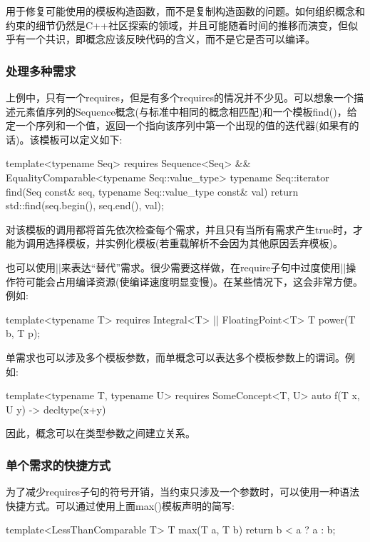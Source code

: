 用于修复可能使用的模板构造函数，而不是复制构造函数的问题。如何组织概念和约束的细节仍然是C++社区探索的领域，并且可能随着时间的推移而演变，但似乎有一个共识，即概念应该反映代码的含义，而不是它是否可以编译。

\subsubsection{处理多种需求}

上例中，只有一个requires，但是有多个requires的情况并不少见。可以想象一个描述元素值序列的Sequence概念(与标准中相同的概念相匹配)和一个模板find()，给定一个序列和一个值，返回一个指向该序列中第一个出现的值的迭代器(如果有的话)。该模板可以定义如下:

\begin{cpp}
template<typename Seq>
	requires Sequence<Seq> &&
			EqualityComparable<typename Seq::value_type>
	typename Seq::iterator find(Seq const& seq,
								typename Seq::value_type const& val)
{
	return std::find(seq.begin(), seq.end(), val);
}
\end{cpp}

对该模板的调用都将首先依次检查每个需求，并且只有当所有需求产生true时，才能为调用选择模板，并实例化模板(若重载解析不会因为其他原因丢弃模板)。

也可以使用||来表达“替代”需求。很少需要这样做，在require子句中过度使用||操作符可能会占用编译资源(使编译速度明显变慢)。在某些情况下，这会非常方便。例如:

\begin{cpp}
template<typename T>
	requires Integral<T> ||
			FloatingPoint<T>
T power(T b, T p);
\end{cpp}

单需求也可以涉及多个模板参数，而单概念可以表达多个模板参数上的谓词。例如:

\begin{cpp}
template<typename T, typename U>
	requires SomeConcept<T, U>
auto f(T x, U y) -> decltype(x+y)
\end{cpp}

因此，概念可以在类型参数之间建立关系。

\subsubsection{单个需求的快捷方式}

为了减少requires子句的符号开销，当约束只涉及一个参数时，可以使用一种语法快捷方式。可以通过使用上面max()模板声明的简写:

\begin{cpp}
template<LessThanComparable T>
T max(T a, T b) {
	return b < a ? a : b;
}
\end{cpp}

